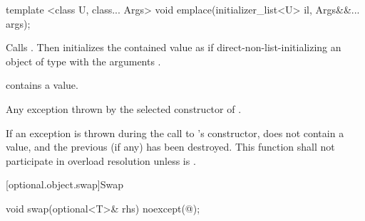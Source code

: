 \begin{itemdecl}
template <class U, class... Args> void emplace(initializer_list<U> il, Args&&... args);
\end{itemdecl}

\begin{itemdescr}
\pnum
\effects
Calls . Then initializes the contained value as if direct-non-list-initializing an object of type  with the arguments .

\pnum
\postcondition
{} contains a value.

\pnum
\throws
Any exception thrown by the selected constructor of .

\pnum
\remarks
If an exception is thrown during the call to 's constructor,  does not contain a value, and the previous  (if any) has been destroyed.
This function shall not participate in overload resolution unless  is .
\end{itemdescr}

[optional.object.swap]{Swap}

%
%
\begin{itemdecl}
void swap(optional<T>& rhs) noexcept(@\seebelow@);
\end{itemdecl}

